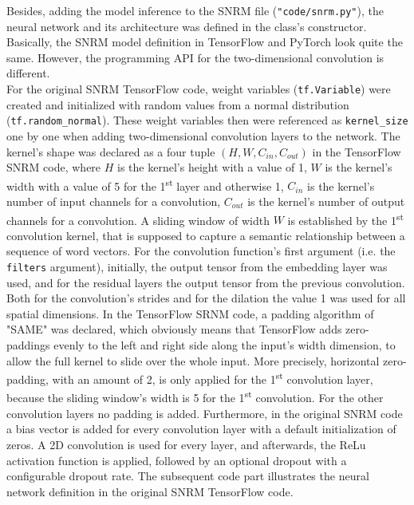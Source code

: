 Besides, adding the model inference to the SNRM file (\texttt{"code/snrm.py"}),
    the neural network and its architecture was defined in the class's constructor.
Basically, the SNRM model definition in TensorFlow and PyTorch look quite the same.
However, the programming API for the two-dimensional convolution is different.\\
For the original SNRM TensorFlow code, weight variables (\texttt{tf.Variable}) were created and
    initialized with random values from a normal distribution (\texttt{tf.random\_normal}).
These weight variables then were referenced as \texttt{kernel\_size} one by one when adding 
    two-dimensional convolution layers to the network.
The kernel's shape was declared as a four tuple $(H, W, C_{in}, C_{out})$ in the TensorFlow 
    SNRM code, where 
    $H$ is the kernel's height with a value of 1,
    $W$ is the kernel's width with a value of 5 for the 1\textsuperscript{st} layer and otherwise 1,
    $C_{in}$ is the kernel's number of input channels for a convolution,
    $C_{out}$ is the kernel's number of output channels for a convolution.
A sliding window of width $W$ is established by the 1\textsuperscript{st} convolution kernel, 
    that is supposed to capture a semantic relationship between a sequence of word vectors.
For the convolution function's first argument (i.e. the \texttt{filters} argument),
    initially, the output tensor from the embedding layer was used, and
    for the residual layers the output tensor from the previous convolution.
Both for the convolution's strides and for the dilation the value 1 was used for all spatial dimensions.
In the TensorFlow SRNM code, a padding algorithm of "SAME" was declared, which obviously means
    that TensorFlow adds zero-paddings evenly to the left and right side along the input's width dimension,
    to allow the full kernel to slide over the whole input.
More precisely, horizontal zero-padding, with an amount of 2, is only applied for 
    the 1\textsuperscript{st} convolution layer,
    because the sliding window's width is 5 for the 1\textsuperscript{st} convolution.
For the other convolution layers no padding is added.
Furthermore, in the original SNRM code a bias vector is added for every convolution layer with a default 
    initialization of zeros.
A 2D convolution is used for every layer, and afterwards, the ReLu activation function is applied,
    followed by an optional dropout with a configurable dropout rate.
The subsequent code part illustrates the neural network definition in the original SNRM TensorFlow code.
